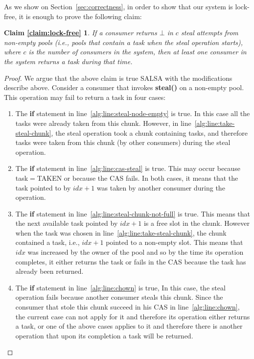As we show on Section~\ref{sec:correctness}, in order to show that our system is lock-free, it is enough to prove the following claim:

\newtheorem*{claim:lock-free}{Claim \ref{claim:lock-free}}
\begin{claim:lock-free}
If a consumer returns $\bot$ in $c$ steal attempts from non-empty pools (i.e., pools that contain a task when the steal operation starts), where $c$ is the number of consumers in the system, then at least one consumer in the system returns a task during that time. 
\end{claim:lock-free}
\begin{proof}
We argue that the above claim is true SALSA with the modifications describe above. Consider a consumer that invokes {\bf steal()} on a non-empty pool. This operation may fail to return a task in four cases:
\begin{enumerate}
 \item The {\bf if} statement in line~\ref{alg:line:steal-node-empty} is true. In this case all the tasks were already taken from this chunk. However, in line~\ref{alg:line:take-steal-chunk}, the steal operation took a chunk containing tasks, and therefore tasks were taken from this chunk (by other consumers) during the steal operation.
 \item The {\bf if} statement in line~\ref{alg:line:cas-steal} is true. This may occur because task$=$TAKEN or because the CAS fails. In both cases, it means that the task pointed to by $idx+1$ was taken by another consumer during the operation.
 \item The {\bf if} statement in line~\ref{alg:line:steal-chunk-not-full} is true. This means that the next available task pointed by $idx+1$ is a free slot in the chunk. However when the task was chosen in line~\ref{alg:line:take-steal-chunk}, the chunk contained a task, i.e., $idx+1$ pointed to a non-empty slot. This means that $idx$ was increased by the owner of the pool and so by the time its operation completes, it either returns the task or fails in the CAS because the task has already been returned.
 \item The {\bf if} statement in line~\ref{alg:line:chown} is true, In this case, the steal operation fails because another consumer steals this chunk. Since the consumer that stole this chunk succeed in his CAS in line~\ref{alg:line:chown}, the current case can not apply for it and therefore its operation either returns a task, or one of the above cases applies to it and therefore there is another operation that upon its completion a task will be returned. 

\end{enumerate}
\end{proof}
